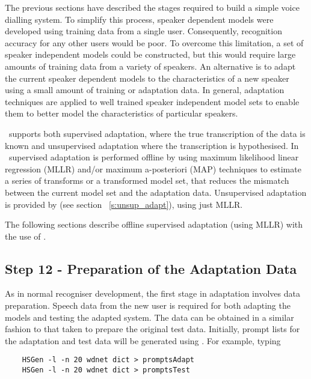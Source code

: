 
The previous sections have described the stages required to build a simple 
voice dialling system. To simplify this process, speaker dependent models were 
developed using training data from a single user. Consequently, recognition 
accuracy for any other users would be poor.
To overcome this limitation, a set of speaker independent models could be 
constructed, but this would require large amounts of training data from a 
variety of speakers. An alternative is to adapt the current speaker dependent 
models to the characteristics of a new speaker using a small amount of 
training or adaptation data. In general, adaptation 
techniques are applied to well trained speaker independent model sets to 
enable them to better model the characteristics of particular speakers.

\HTK\ supports both supervised adaptation, 
where the true transcription of the data is known and unsupervised 
adaptation where the
transcription is hypothesised.
In \HTK\ supervised adaptation is performed offline by
 using maximum likelihood linear regression
(MLLR) 
and/or maximum a-posteriori (MAP) techniques to 
estimate
a series of transforms or a transformed model set, that reduces the mismatch 
between the current model set and the adaptation data. Unsupervised 
adaptation is provided by  (see section
~\ref{s:unsup_adapt}), using just MLLR.

The following sections describe offline supervised adaptation (using
MLLR) with the use of .

\subsection{Step 12 - Preparation of the Adaptation Data}

As in normal recogniser development, the first stage in adaptation involves 
data preparation. Speech data from the new user is required for both adapting 
the models and testing the adapted system. The data can be obtained in a 
similar fashion to that taken to prepare the original test data.
Initially, prompt lists for the adaptation and test data will be generated using 
. For example, typing

\begin{verbatim}
    HSGen -l -n 20 wdnet dict > promptsAdapt
    HSGen -l -n 20 wdnet dict > promptsTest
\end{verbatim}

